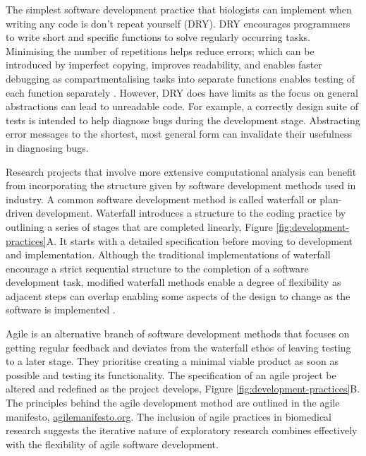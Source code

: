 \documentclass[../main.tex]{subfiles}
\begin{document}
The simplest software development practice that biologists can implement when writing any code is don't repeat yourself (DRY).
DRY encourages programmers to write short and specific functions to solve regularly occurring tasks. 
Minimising the number of repetitions helps reduce errors; which can be introduced by imperfect copying, improves readability, and enables faster debugging as compartmentalising tasks into separate functions enables testing of each function separately \parencite{Thomas1999}.
However, DRY does have limits as the focus on general abstractions can lead to unreadable code.
For example, a correctly design suite of tests is intended to help diagnose bugs during the development stage.
Abstracting error messages to the shortest, most general form can invalidate their usefulness in diagnosing bugs.

Research projects that involve more extensive computational analysis can benefit from incorporating the structure given by software development methods used in industry.
A common software development method is called waterfall or plan-driven development.
Waterfall introduces a structure to the coding practice by outlining a series of stages that are completed linearly, Figure \ref{fig:development-practices}A.
It starts with a detailed specification before moving to development and implementation.
Although the traditional implementations of waterfall encourage a strict sequential structure to the completion of a software development task, modified waterfall methods enable a degree of flexibility as adjacent steps can overlap enabling some aspects of the design to change as the software is implemented \parencite{McConnell1996}. 

Agile is an alternative branch of software development methods that focuses on getting regular feedback and deviates from the waterfall ethos of leaving testing to a later stage.
They prioritise creating a minimal viable product as soon as possible and testing its functionality.
The specification of an agile project be altered and redefined as the project develops, Figure \ref{fig:development-practices}B. 
The principles behind the agile development method are outlined in the agile manifesto, \href{https://agilemanifesto.org/principles.html}{agilemanifesto.org}.
The inclusion of agile practices in biomedical research suggests the iterative nature of exploratory research combines effectively with the flexibility of agile software development\parencite{kane2006}.
\end{document}
